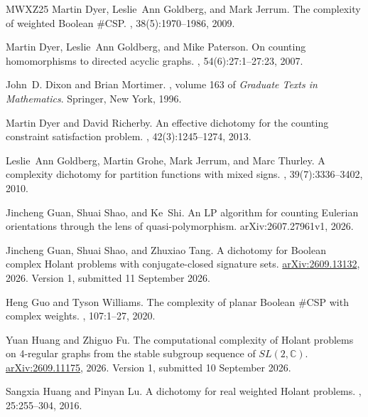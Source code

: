 \documentclass[11pt,letterpaper,onecolumn]{article}
\theoremstyle{plain}
\theoremstyle{definition}
\theoremstyle{remark}
\begin{document}
\begin{thebibliography}{MWXZ25}
Martin Dyer, Leslie~Ann Goldberg, and Mark Jerrum.
\newblock The complexity of weighted {Boolean} {{\#CSP}}.
, 38(5):1970--1986, 2009.

Martin Dyer, Leslie~Ann Goldberg, and Mike Paterson.
\newblock On counting homomorphisms to directed acyclic graphs.
, 54(6):27:1--27:23, 2007.

John~D. Dixon and Brian Mortimer.
, volume 163 of {\em Graduate Texts in
  Mathematics}.
\newblock Springer, New York, 1996.

Martin Dyer and David Richerby.
\newblock An effective dichotomy for the counting constraint satisfaction
  problem.
, 42(3):1245--1274, 2013.

Leslie~Ann Goldberg, Martin Grohe, Mark Jerrum, and Marc Thurley.
\newblock A complexity dichotomy for partition functions with mixed signs.
, 39(7):3336--3402, 2010.

Jincheng Guan, Shuai Shao, and Ke~Shi.
\newblock An {LP} algorithm for counting {Eulerian} orientations through the
  lens of quasi-polymorphism.
\newblock arXiv:2607.27961v1, 2026.

Jincheng Guan, Shuai Shao, and Zhuxiao Tang.
\newblock A dichotomy for {Boolean} complex {Holant} problems with
  conjugate-closed signature sets.
\newblock \href{https://arxiv.org/abs/2609.13132}{arXiv:2609.13132}, 2026.
\newblock Version 1, submitted 11 September 2026.

Heng Guo and Tyson Williams.
\newblock The complexity of planar {Boolean} {{\#CSP}} with complex weights.
, 107:1--27, 2020.

Yuan Huang and Zhiguo Fu.
\newblock The computational complexity of {Holant} problems on 4-regular graphs
  from the stable subgroup sequence of {$SL(2,\mathbb{C})$}.
\newblock \href{https://arxiv.org/abs/2609.11175}{arXiv:2609.11175}, 2026.
\newblock Version 1, submitted 10 September 2026.

Sangxia Huang and Pinyan Lu.
\newblock A dichotomy for real weighted {Holant} problems.
, 25:255--304, 2016.


\end{thebibliography}
\end{document}
